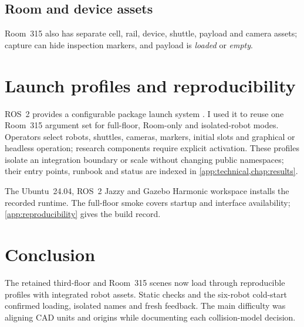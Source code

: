 \FloatBarrier

\subsection{Room and device assets}

Room~315 also has separate cell, rail, device, shuttle, payload and camera assets;
capture can hide inspection markers, and payload is \emph{loaded} or \emph{empty}.

\section{Launch profiles and reproducibility}

ROS~2 provides a configurable package launch system \citep{ros2launch}. I used
it to reuse one Room~315 argument set for full-floor, Room-only and
isolated-robot modes. Operators select robots, shuttles, cameras, markers,
initial slots and graphical or headless operation; research components require
explicit activation. These profiles isolate an integration boundary or scale
without changing public namespaces; their entry points, runbook and status are
indexed in \cref{app:technical,chap:results}.

The Ubuntu~24.04, ROS~2 Jazzy and Gazebo Harmonic workspace installs the recorded
runtime. The full-floor smoke covers startup and interface availability;
\cref{app:reproducibility} gives the build record.

\section{Conclusion}

The retained third-floor and Room~315 scenes now load through reproducible
profiles with integrated robot assets. Static checks and the six-robot
cold-start confirmed loading, isolated names and fresh feedback. The main
difficulty was aligning CAD units and origins while documenting each
collision-model decision.

